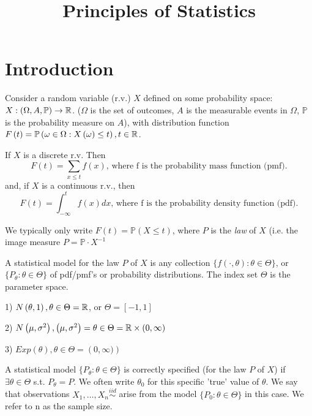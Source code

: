 \documentclass[a4paper]{article}
\title{Principles of Statistics}
\date{}
\begin{document}
	
\maketitle

\section{Introduction}

Consider a random variable (r.v.) $X$ defined on some probability space: $ X: (\Omega, A, \mathbb{P}) \to \mathbb{R}$. ($\Omega$ is the set of outcomes, $A$ is the measurable events in $\Omega$, $\mathbb{P}$ is the probability measure on $A $), with distribution function $F\left( t \right) = \mathbb{P}\left( \omega \in  \Omega : X\left( \omega \right) \le  t\right), t \in \mathbb{R}$.

If $X$ is a discrete r.v. Then
\[
	F(t) = \sum_{x\le t} f(x) \textrm{, where f is the probability mass function (pmf)}
.\] 
and, if $X$ is a continuous r.v., then
\[
	F(t) = \int_{- \infty}^{t} f(x) dx \textrm{, where f is the probability density function (pdf)}
.\] 

We typically only write $F(t) = \mathbb{P}\left( X \le  t\right)$, where $P$ is the \textit{law} of  $X$ (i.e. the image measure  $P = \mathbb{P} \cdot X^{-1} $

\begin{defn}
	A statistical model for the law $P$ of $X$ is any collection $\{ f\left(\cdot, \theta \right): \theta \in \Theta \} $, or $\{ P_{\theta} : \theta \in \Theta\} $ of pdf/pmf's or probability distributions. The index set $\Theta$ is the parameter space.
\end{defn}

\begin{eg}
	1) $N\left( \theta, 1 \right), \theta \in \Theta = \mathbb{R} $, or $\Theta = \left[ -1, 1 \right] $

	2) $N\left( \mu, \sigma ^2 \right), \left( \mu, \sigma ^2 \right) = \theta \in  \Theta = \mathbb{R} \times \left( 0, \infty \right)  $
	
	3) $Exp\left( \theta \right) , \theta \in \Theta = \left( 0, \infty) \right)  $
\end{eg}

\begin{defn}
	A statistical model $\{ P_{\theta} : \theta \in \Theta \} $ is correctly specified (for the law $P$ of $X$) if $\exists \theta \in \Theta$ s.t. $P_{\theta} = P$. We often write $\theta_{0}$ for this specific 'true' value of $\theta$. We say that observations $X_{1}, \ldots, X_{n} \stackrel{iid}{\sim} $ arise from the model $\{ P_{0} : \theta \in \Theta\} $ in this case. We refer to n as the sample size.
\end{defn}
\end{document}
